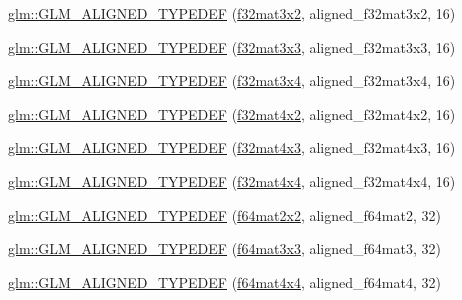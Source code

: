 \begin{DoxyCompactItemize}
\item 
\hyperlink{group__gtx__type__aligned_gac09663c42566bcb58d23c6781ac4e85a}{glm\+::\+G\+L\+M\+\_\+\+A\+L\+I\+G\+N\+E\+D\+\_\+\+T\+Y\+P\+E\+D\+EF} (\hyperlink{group__gtc__type__precision_ga924b933089d954df062aa8d0735fc005}{f32mat3x2}, aligned\+\_\+f32mat3x2, 16)
\item 
\hyperlink{group__gtx__type__aligned_ga3f510999e59e1b309113e1d561162b29}{glm\+::\+G\+L\+M\+\_\+\+A\+L\+I\+G\+N\+E\+D\+\_\+\+T\+Y\+P\+E\+D\+EF} (\hyperlink{group__gtc__type__precision_ga177c076d6d9aea27a5ae87b52607e57a}{f32mat3x3}, aligned\+\_\+f32mat3x3, 16)
\item 
\hyperlink{group__gtx__type__aligned_ga2c9c94f0c89cd71ce56551db6cf4aaec}{glm\+::\+G\+L\+M\+\_\+\+A\+L\+I\+G\+N\+E\+D\+\_\+\+T\+Y\+P\+E\+D\+EF} (\hyperlink{group__gtc__type__precision_ga8459d79e94eb107e31f0ee600e9bae3f}{f32mat3x4}, aligned\+\_\+f32mat3x4, 16)
\item 
\hyperlink{group__gtx__type__aligned_ga99ce8274c750fbfdf0e70c95946a2875}{glm\+::\+G\+L\+M\+\_\+\+A\+L\+I\+G\+N\+E\+D\+\_\+\+T\+Y\+P\+E\+D\+EF} (\hyperlink{group__gtc__type__precision_gab0498cc84bb77002f41630e3cd0be87b}{f32mat4x2}, aligned\+\_\+f32mat4x2, 16)
\item 
\hyperlink{group__gtx__type__aligned_ga9476ef66790239df53dbe66f3989c3b5}{glm\+::\+G\+L\+M\+\_\+\+A\+L\+I\+G\+N\+E\+D\+\_\+\+T\+Y\+P\+E\+D\+EF} (\hyperlink{group__gtc__type__precision_ga74544c9bd76adba0e7767b6b2a574d0f}{f32mat4x3}, aligned\+\_\+f32mat4x3, 16)
\item 
\hyperlink{group__gtx__type__aligned_gacc429b3b0b49921e12713b6d31e14e1d}{glm\+::\+G\+L\+M\+\_\+\+A\+L\+I\+G\+N\+E\+D\+\_\+\+T\+Y\+P\+E\+D\+EF} (\hyperlink{group__gtc__type__precision_ga2ba95a5c37eef05b26ac10e03daa5c84}{f32mat4x4}, aligned\+\_\+f32mat4x4, 16)
\item 
\hyperlink{group__gtx__type__aligned_ga88f6c6fa06e6e64479763e69444669cf}{glm\+::\+G\+L\+M\+\_\+\+A\+L\+I\+G\+N\+E\+D\+\_\+\+T\+Y\+P\+E\+D\+EF} (\hyperlink{group__gtc__type__precision_gae18de078e2885803ceda215c6e04a08a}{f64mat2x2}, aligned\+\_\+f64mat2, 32)
\item 
\hyperlink{group__gtx__type__aligned_gaae8e4639c991e64754145ab8e4c32083}{glm\+::\+G\+L\+M\+\_\+\+A\+L\+I\+G\+N\+E\+D\+\_\+\+T\+Y\+P\+E\+D\+EF} (\hyperlink{group__gtc__type__precision_ga3b494201796c4200886e59f9695ecff0}{f64mat3x3}, aligned\+\_\+f64mat3, 32)
\item 
\hyperlink{group__gtx__type__aligned_ga6e9094f3feb3b5b49d0f83683a101fde}{glm\+::\+G\+L\+M\+\_\+\+A\+L\+I\+G\+N\+E\+D\+\_\+\+T\+Y\+P\+E\+D\+EF} (\hyperlink{group__gtc__type__precision_ga5fc21633b1546e4599609c47b4c8dac4}{f64mat4x4}, aligned\+\_\+f64mat4, 32)

\end{DoxyCompactItemize}
